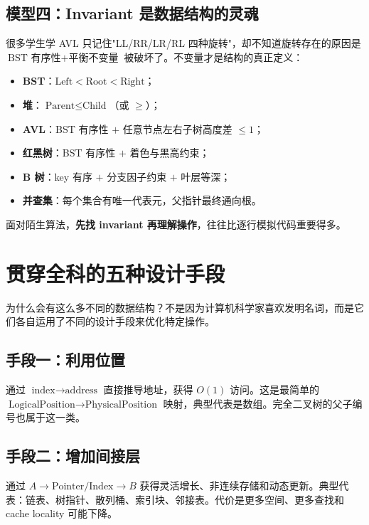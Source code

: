\documentclass[11pt,a4paper,openany]{ctexbook}
\newcommand{\key}[1]{\textbf{\color{deep}#1}}
\begin{document}
\subsection{模型四：Invariant 是数据结构的灵魂}

很多学生学 AVL 只记住"LL/RR/LR/RL 四种旋转"，却不知道旋转存在的原因是 $\text{BST 有序性}+\text{平衡不变量}$ 被破坏了。不变量才是结构的真正定义：

\begin{itemize}
  \item \key{BST}：$\text{Left}<\text{Root}<\text{Right}$；
  \item \key{堆}：$\text{Parent}\le\text{Child}$（或 $\ge$）；
  \item \key{AVL}：BST 有序性 $+$ 任意节点左右子树高度差 $\le 1$；
  \item \key{红黑树}：BST 有序性 $+$ 着色与黑高约束；
  \item \key{B 树}：key 有序 $+$ 分支因子约束 $+$ 叶层等深；
  \item \key{并查集}：每个集合有唯一代表元，父指针最终通向根。
\end{itemize}

面对陌生算法，\key{先找 invariant 再理解操作}，往往比逐行模拟代码重要得多。

\section{贯穿全科的五种设计手段}

为什么会有这么多不同的数据结构？不是因为计算机科学家喜欢发明名词，而是它们各自运用了不同的设计手段来优化特定操作。

\subsection{手段一：利用位置}

通过 $\text{index}\rightarrow\text{address}$ 直接推导地址，获得 $O(1)$ 访问。这是最简单的 $\text{LogicalPosition}\rightarrow\text{PhysicalPosition}$ 映射，典型代表是数组。完全二叉树的父子编号也属于这一类。

\subsection{手段二：增加间接层}

通过 $A\rightarrow\text{Pointer/Index}\rightarrow B$ 获得灵活增长、非连续存储和动态更新。典型代表：链表、树指针、散列桶、索引块、邻接表。代价是更多空间、更多查找和 cache locality 可能下降。
\end{document}
